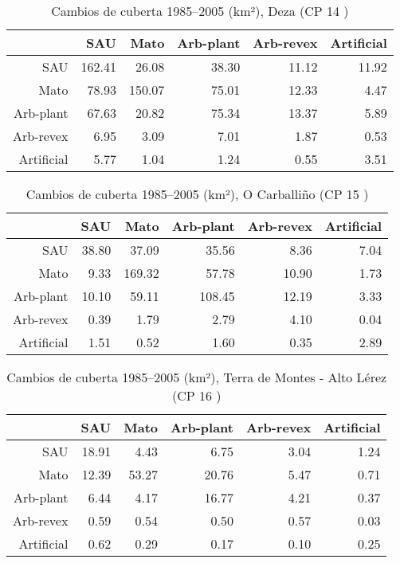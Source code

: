 \begin{table}[p]
\centering
\caption{Cambios de cuberta 1985--2005 (km²), Deza (CP 14 )} 
\label{TaboaContinxCP14}
\begin{tabular}{rrrrrr}
  \hline
 & SAU & Mato & Arb-plant & Arb-revex & Artificial \\ 
  \hline
SAU & 162.41 & 26.08 & 38.30 & 11.12 & 11.92 \\ 
  Mato & 78.93 & 150.07 & 75.01 & 12.33 & 4.47 \\ 
  Arb-plant & 67.63 & 20.82 & 75.34 & 13.37 & 5.89 \\ 
  Arb-revex & 6.95 & 3.09 & 7.01 & 1.87 & 0.53 \\ 
  Artificial & 5.77 & 1.04 & 1.24 & 0.55 & 3.51 \\ 
   \hline
\end{tabular}
\end{table}
\begin{table}[p]
\centering
\caption{Cambios de cuberta 1985--2005 (km²), O Carballiño (CP 15 )} 
\label{TaboaContinxCP15}
\begin{tabular}{rrrrrr}
  \hline
 & SAU & Mato & Arb-plant & Arb-revex & Artificial \\ 
  \hline
SAU & 38.80 & 37.09 & 35.56 & 8.36 & 7.04 \\ 
  Mato & 9.33 & 169.32 & 57.78 & 10.90 & 1.73 \\ 
  Arb-plant & 10.10 & 59.11 & 108.45 & 12.19 & 3.33 \\ 
  Arb-revex & 0.39 & 1.79 & 2.79 & 4.10 & 0.04 \\ 
  Artificial & 1.51 & 0.52 & 1.60 & 0.35 & 2.89 \\ 
   \hline
\end{tabular}
\end{table}
\begin{table}[p]
\centering
\caption{Cambios de cuberta 1985--2005 (km²), Terra de Montes - Alto Lérez (CP 16 )} 
\label{TaboaContinxCP16}
\begin{tabular}{rrrrrr}
  \hline
 & SAU & Mato & Arb-plant & Arb-revex & Artificial \\ 
  \hline
SAU & 18.91 & 4.43 & 6.75 & 3.04 & 1.24 \\ 
  Mato & 12.39 & 53.27 & 20.76 & 5.47 & 0.71 \\ 
  Arb-plant & 6.44 & 4.17 & 16.77 & 4.21 & 0.37 \\ 
  Arb-revex & 0.59 & 0.54 & 0.50 & 0.57 & 0.03 \\ 
  Artificial & 0.62 & 0.29 & 0.17 & 0.10 & 0.25 \\ 
   \hline
\end{tabular}
\end{table}
